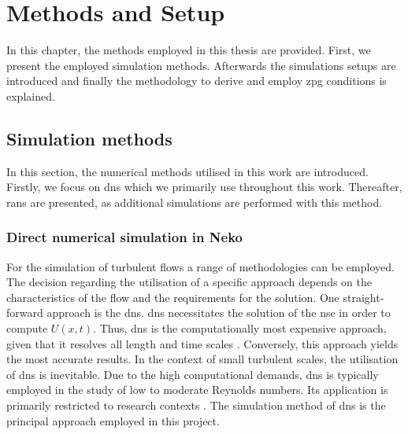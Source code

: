 
\chapter{Methods and Setup} \label{chap:methods and Setup}



In this chapter, the methods employed in this thesis are provided. 
First, we present the employed simulation methods.
Afterwards the simulations setups are introduced and finally the methodology to derive and employ \acrshort{zpg} conditions is explained. 

\section{Simulation methods}\label{sec:SimMethods}
In this section, the numerical methods utilised in this work are introduced.
Firstly, we focus on \acrfull{dns} which we primarily use throughout this work.
Thereafter, \acrfull{rans} are presented, as additional simulations are performed with this method.
\subsection{Direct numerical simulation in Neko}\label{subsec:DNSmethod}

For the simulation of turbulent flows a range of methodologies can be employed.
The decision regarding the utilisation of a specific approach  depends on the characteristics of the flow and the requirements for the solution.
One straight-forward approach is the \acrshort{dns}.
\acrshort{dns} necessitates the solution of the \acrshort{nse} in order to compute  $U(x,t)$.
Thus, \acrshort{dns} is the computationally most expensive approach, given that it resolves all length and time scales \citep{pope_turbulent_2015}. 
Conversely, this approach yields  the most accurate results.
In the context of small turbulent scales, the utilisation of \acrshort{dns} is inevitable.
Due to the high computational demands, \acrshort{dns} is typically employed in the study of low to moderate Reynolds numbers. 
Its application is primarily restricted to  research contexts  \citep{slotnick_cfd_nodate}.
The simulation method of \acrshort{dns} is the principal approach employed in this project.

